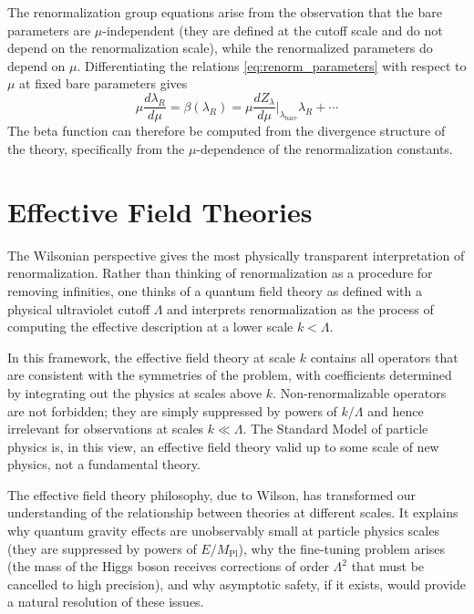\documentclass[11pt, twoside, openright]{book}
\theoremstyle{dotted}
\theoremstyle{definition}
\begin{document}
The renormalization group equations arise from the observation that the bare
parameters are $\mu$-independent (they are defined at the cutoff scale and do not
depend on the renormalization scale), while the renormalized parameters do depend
on $\mu$. Differentiating the relations \eqref{eq:renorm_parameters} with respect
to $\mu$ at fixed bare parameters gives
\begin{equation}
  \mu\frac{d\lambda_R}{d\mu} = \beta(\lambda_R) = \mu\frac{dZ_\lambda}{d\mu}
  \bigg|_{\lambda_{\text{bare}}} \lambda_R + \cdots
  \label{eq:beta_from_Z}
\end{equation}
The beta function can therefore be computed from the divergence structure of the
theory, specifically from the $\mu$-dependence of the renormalization constants.

\section{Effective Field Theories}

The Wilsonian perspective gives the most physically transparent interpretation of
renormalization. Rather than thinking of renormalization as a procedure for
removing infinities, one thinks of a quantum field theory as defined with a physical
ultraviolet cutoff $\Lambda$ and interprets renormalization as the process of
computing the effective description at a lower scale $k < \Lambda$.

In this framework, the effective field theory at scale $k$ contains all operators
that are consistent with the symmetries of the problem, with coefficients determined
by integrating out the physics at scales above $k$. Non-renormalizable operators
are not forbidden; they are simply suppressed by powers of $k/\Lambda$ and hence
irrelevant for observations at scales $k \ll \Lambda$. The Standard Model of
particle physics is, in this view, an effective field theory valid up to some
scale of new physics, not a fundamental theory.

The effective field theory philosophy, due to Wilson, has transformed our
understanding of the relationship between theories at different scales. It explains
why quantum gravity effects are unobservably small at particle physics scales (they
are suppressed by powers of $E/M_{\text{Pl}}$), why the fine-tuning problem arises
(the mass of the Higgs boson receives corrections of order $\Lambda^2$ that must
be cancelled to high precision), and why asymptotic safety, if it exists, would
provide a natural resolution of these issues.
\end{document}

